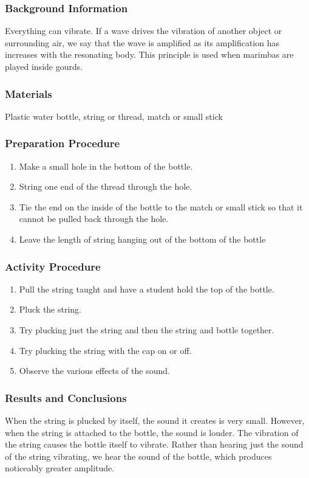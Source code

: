 \subsubsection*{Background Information}
Everything can vibrate.  If a wave drives the vibration of another object or surrounding air, we say that the wave is amplified as its amplification has increases with the resonating body.  This principle is used when marimbas are played inside gourds.

\subsubsection*{Materials}
Plastic water bottle, string or thread, match or small stick

\subsubsection*{Preparation Procedure}
\begin{enumerate}
\item{Make a small hole in the bottom of the bottle.}
\item{String one end of the thread through the hole.}
\item{Tie the end on the inside of the bottle to the match or small stick so that it cannot be pulled back through the hole.}
\item{Leave the length of string hanging out of the bottom of the bottle}
\end{enumerate}

\subsubsection*{Activity Procedure}
\begin{enumerate}
\item{Pull the string taught and have a student hold the top of the bottle.}
\item{Pluck the string.}
\item{Try plucking just the string and then the string and bottle together.}
\item{Try plucking the string with the cap on or off.}
\item{Observe the various effects of the sound.}
\end{enumerate}

\subsubsection*{Results and Conclusions}
When the string is plucked by itself, the sound it creates is very small.  However, when the string is attached to the bottle, the sound is louder.  The vibration of the string causes the bottle itself to vibrate.  Rather than hearing just the sound of the string vibrating, we hear the sound of the bottle, which produces noticeably greater amplitude.

